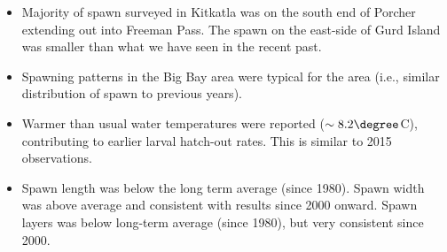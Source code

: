 \begin{itemize}
\item Majority of spawn surveyed in Kitkatla was on the south end of Porcher extending out into Freeman Pass.
The spawn on the east-side of Gurd Island was smaller than what we have seen in the recent past.
\item Spawning patterns in the Big Bay area were typical for the area (i.e., similar distribution of spawn to previous years).
\item Warmer than usual water temperatures were reported ($\sim8.2\degree$C), contributing to earlier larval hatch-out rates.
This is similar to 2015 observations.
\item Spawn length was below the long term average (since 1980).
Spawn width was above average and consistent with results since 2000 onward.
Spawn layers was below long-term average (since 1980), but very consistent since 2000.
\end{itemize}